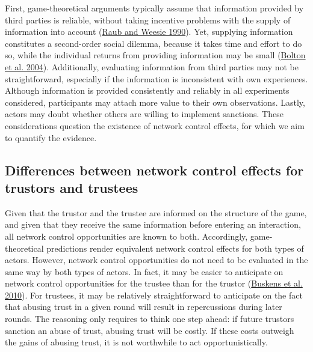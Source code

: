 \documentclass[
  11pt,
]{article}
\begin{document}
First, game-theoretical arguments typically assume that information provided by third parties is reliable, without taking incentive problems with the supply of information into account (\protect\hyperlink{ref-raub_weesie_reputation_1990}{Raub and Weesie 1990}).
Yet, supplying information constitutes a second-order social dilemma, because it takes time and effort to do so, while the individual returns from providing information may be small (\protect\hyperlink{ref-bolton_electronic_2004}{Bolton et al. 2004}).
Additionally, evaluating information from third parties may not be straightforward, especially if the information is inconsistent with own experiences.
Although information is provided consistently and reliably in all experiments considered, participants may attach more value to their own observations.
Lastly, actors may doubt whether others are willing to implement sanctions.
These considerations question the existence of network control effects, for which we aim to quantify the evidence.

\hypertarget{differences-between-network-control-effects-for-trustors-and-trustees}{%
\subsection{Differences between network control effects for trustors and trustees}\label{differences-between-network-control-effects-for-trustors-and-trustees}}

Given that the trustor and the trustee are informed on the structure of the game, and given that they receive the same information before entering an interaction, all network control opportunities are known to both.
Accordingly, game-theoretical predictions render equivalent network control effects for both types of actors.
However, network control opportunities do not need to be evaluated in the same way by both types of actors.
In fact, it may be easier to anticipate on network control opportunities for the trustee than for the trustor (\protect\hyperlink{ref-buskens_raub_veer_triads_2010}{Buskens et al. 2010}).
For trustees, it may be relatively straightforward to anticipate on the fact that abusing trust in a given round will result in repercussions during later rounds.
The reasoning only requires to think one step ahead: if future trustors sanction an abuse of trust, abusing trust will be costly.
If these costs outweigh the gains of abusing trust, it is not worthwhile to act opportunistically.
\end{document}
